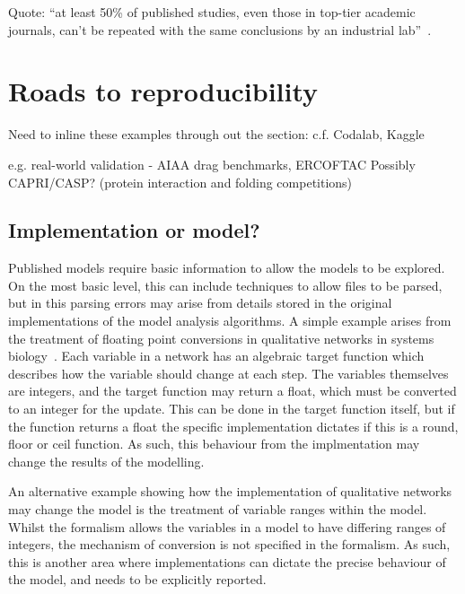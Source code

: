 \documentclass[conference]{IEEEtran}
\begin{document}
Quote: ``at least 50\% of published studies, even those in top-tier
academic journals, can't be repeated with the same conclusions by an
industrial lab''~\cite{osherovich:2011}.



\section{Roads to reproducibility}


Need to inline these examples through out the section: 
	c.f. Codalab, Kaggle

	e.g. real-world validation - AIAA drag benchmarks, ERCOFTAC
	Possibly CAPRI/CASP? (protein interaction and folding competitions)


\subsection{Implementation or model?}

Published models require basic information to allow the models to be
explored. On the most basic level, this can include techniques to allow
files to be parsed, but in this parsing errors may arise from details 
stored in the original implementations of the model analysis algorithms.
A simple example arises from the treatment of floating point conversions
in qualitative networks in systems biology~\cite{Schaub2007}. Each
variable in a network has an algebraic target function which describes
how the variable should change at each step. The variables themselves are
integers, and the target function may return a float, which must be converted
to an integer for the update. This can be done in the target function 
itself, but if the function returns a float the specific implementation
dictates if this is a round, floor or ceil function. As such, this behaviour
from the implmentation may change the results of the modelling.

An alternative example showing how the implementation of qualitative networks
may change the model is the treatment of variable ranges within the model.
Whilst the formalism allows the variables in a model to have differing 
ranges of integers, the mechanism of conversion is not specified in the 
formalism. As such, this is another area where implementations can dictate
the precise behaviour of the model, and needs to be explicitly reported.
\end{document}
